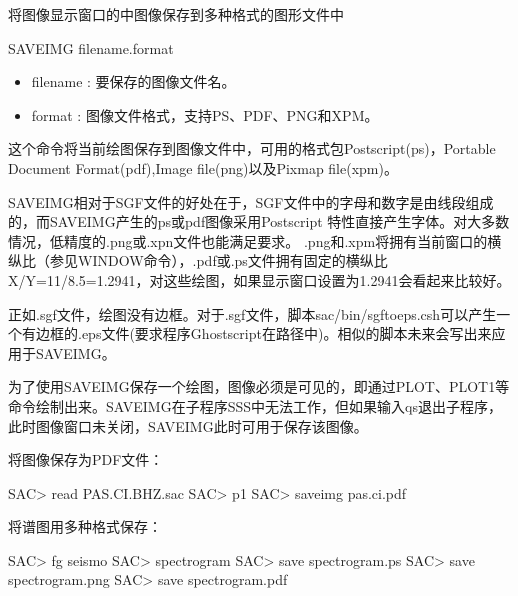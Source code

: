 \label{cmd:saveimg}

将图像显示窗口的中图像保存到多种格式的图形文件中

\begin{SACSTX}
SAVEIMG filename.format
\end{SACSTX}

\begin{itemize}
\item filename : 要保存的图像文件名。 
\item format : 图像文件格式，支持PS、PDF、PNG和XPM。
\end{itemize}

这个命令将当前绘图保存到图像文件中，可用的格式包Postscript(ps)，Portable Document Format(pdf),Image file(png)以及Pixmap file(xpm)。

SAVEIMG相对于SGF文件的好处在于，SGF文件中的字母和数字是由线段组成的，而SAVEIMG产生的ps或pdf图像采用Postscript 特性直接产生字体。对大多数情况，低精度的.png或.xpn文件也能满足要求。
.png和.xpm将拥有当前窗口的横纵比（参见WINDOW命令），.pdf或.ps文件拥有固定的横纵比X/Y=11/8.5=1.2941，对这些绘图，如果显示窗口设置为1.2941会看起来比较好。

正如.sgf文件，绘图没有边框。对于.sgf文件，脚本sac/bin/sgftoeps.csh可以产生一个有边框的.eps文件(要求程序Ghostscript在路径中)。相似的脚本未来会写出来应用于SAVEIMG。

为了使用SAVEIMG保存一个绘图，图像必须是可见的，即通过PLOT、PLOT1等命令绘制出来。SAVEIMG在子程序SSS中无法工作，但如果输入qs退出子程序，此时图像窗口未关闭，SAVEIMG此时可用于保存该图像。

将图像保存为PDF文件：
\begin{SACCode}
SAC> read PAS.CI.BHZ.sac
SAC> p1
SAC> saveimg pas.ci.pdf
\end{SACCode}

将谱图用多种格式保存：
\begin{SACCode}
SAC> fg seismo
SAC> spectrogram
SAC> save spectrogram.ps
SAC> save spectrogram.png
SAC> save spectrogram.pdf
\end{SACCode}
